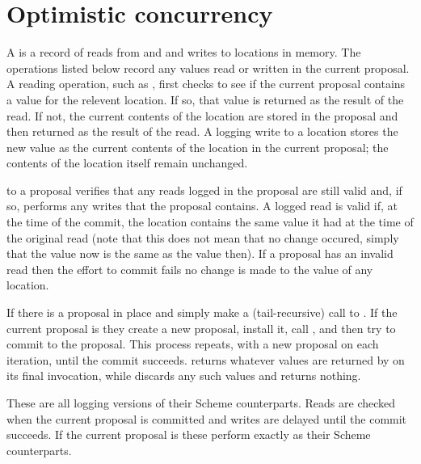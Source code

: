 \documentclass[twoside]{report}
\begin{document}
\label{top_node}

\section{Optimistic concurrency}

A  is a record of reads from and and writes to locations in
 memory.
The  operations listed below record any values read or
 written in the current proposal.
A reading operation, such as , first checks to
 see if the current proposal contains a value for the relevent location.
If so, that value is returned as the result of the read.
If not, the current contents of the location are stored in the proposal and
 then returned as the result of the read.
A logging write to a location stores the new value as the current contents of
 the location in the current proposal; the contents of the location itself
 remain unchanged.

 to a proposal verifies that any reads logged in
 the proposal are still valid and, if so, performs any writes that
 the proposal contains.
A logged read is valid if, at the time of the commit, the location contains
 the same value it had at the time of the original read (note that this does
 not mean that no change occured, simply that the value now is the same as
 the value then).
If a proposal has an invalid read then the effort to commit fails no change
 is made to the value of any location.

\begin{protos}
\end{protos}
\noindent
If there is a proposal in place 
  and 
 simply make a (tail-recursive) call to .
If the current proposal is  they create a new proposal,
 install it, call , and then try to commit to the proposal.
This process repeats, with a new proposal on each iteration, until
 the commit succeeds.
 returns whatever values are returned by 
 on its final invocation, while  discards any such
 values and returns nothing.

\begin{protos}
\end{protos}
\noindent
These are all logging versions of their Scheme counterparts.
Reads are checked when the current proposal is committed and writes are
 delayed until the commit succeeds.
If the current proposal is  these perform exactly as their Scheme
 counterparts.
\end{document}
